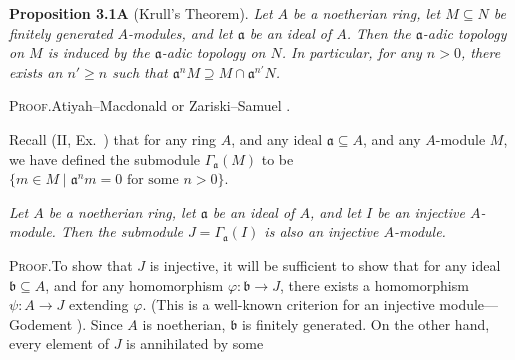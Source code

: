 {\par\smallskip\noindent\hypertarget{result-III-3.1A}{}\textbf{Proposition 3.1A} (Krull's Theorem). \emph{Let $A$ be a noetherian ring, let $M\subseteq N$ be finitely generated $A$-modules, and let $\mathfrak a$ be an ideal of $A$. Then the $\mathfrak a$-adic topology on $M$ is induced by the $\mathfrak a$-adic topology on $N$. In particular, for any $n>0$, there exists an $n'\geqslant n$ such that $\mathfrak a^nM\supseteq M\cap\mathfrak a^{n'}N$.}

\par\noindent\textsc{Proof.}\enspace Atiyah--Macdonald  or Zariski--Samuel .

\medskip
Recall (II, Ex.~) that for any ring $A$, and any ideal $\mathfrak a\subseteq A$, and any $A$-module $M$, we have defined the submodule $\Gamma_{\mathfrak a}(M)$ to be $\{m\in M\mid\mathfrak a^nm=0\text{ for some }n>0\}$.

 \emph{Let $A$ be a noetherian ring, let $\mathfrak a$ be an ideal of $A$, and let $I$ be an injective $A$-module. Then the submodule $J=\Gamma_{\mathfrak a}(I)$ is also an injective $A$-module.}

\par\smallskip\noindent\textsc{Proof.}\enspace To show that $J$ is injective, it will be sufficient to show that for any ideal $\mathfrak b\subseteq A$, and for any homomorphism $\varphi\colon\mathfrak b\to J$, there exists a homomorphism $\psi\colon A\to J$ extending $\varphi$. (This is a well-known criterion for an injective module---Godement ). Since $A$ is noetherian, $\mathfrak b$ is finitely generated. On the other hand, every element of $J$ is annihilated by some
}
\usetikzlibrary{arrows}
